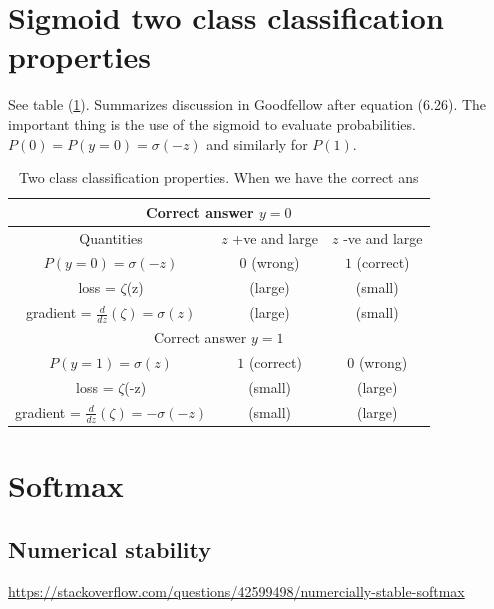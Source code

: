 \documentclass{article}
\newcommand{\dd}[2]{\frac{d}{d{#2}}{(#1)} }
\newcommand{\ra}[1]{\renewcommand{\arraystretch}{#1}}
\begin{document}
\section{Sigmoid two class classification properties}
See table (\ref{tab:sigmoid}). Summarizes discussion in Goodfellow after equation (6.26). The important thing is the use of the sigmoid to evaluate probabilities. $P(0)=P(y=0)=\sigma(-z)$ and similarly for $P(1)$.
\begin{table}\centering
  \ra{1.3}
  \begin{tabular}{ccc}
    \toprule
    \multicolumn{3}{c}{Correct answer $y=0$}\\
    \midrule
    {Quantities} &  {$z$ +ve and large }  & {$z$ -ve and large}\\
    \midrule
    $P(y=0)=\sigma(-z)$  &  $0$ (wrong)  &  $1$ (correct)\\
    loss = $\zeta$(z)    &  (large)      &  (small)\\
    gradient = $\dd{\zeta}{z}=\sigma(z)$ & (large)  & (small)\\
    \toprule
    \multicolumn{3}{c}{Correct answer $y=1$}\\
    \midrule
    $P(y=1)=\sigma(z)$  &  $1$ (correct)  &  $0$ (wrong)\\
    loss = $\zeta$(-z)    &  (small)      &  (large)\\
    gradient = $\dd{\zeta}{z}=-\sigma(-z)$ & (small)  & (large)\\
    \midrule
  \end{tabular}
  \caption{\label{tab:sigmoid} Two class classification properties. When we have the correct ans}  
\end{table}
\section{Softmax}
\subsection{Numerical stability}
\url{https://stackoverflow.com/questions/42599498/numercially-stable-softmax}
\end{document}
